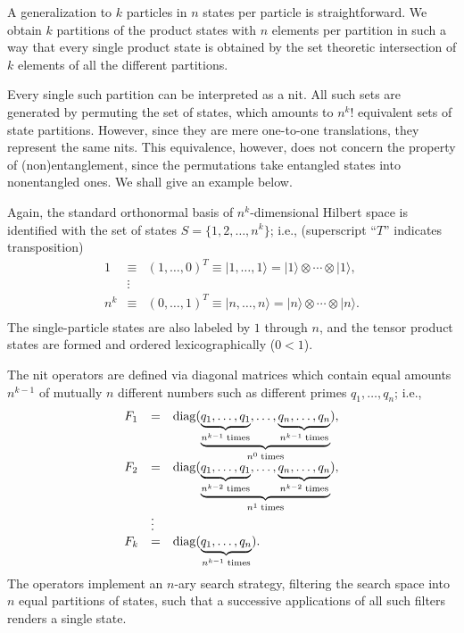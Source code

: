 A generalization to $k$ particles in $n$ states per particle is straightforward.
We obtain
$k$ partitions of the product states with
$n$ elements per partition in such a way that
every single product state is obtained by the set theoretic intersection of
$k$ elements of all the different partitions.

Every single such partition can be interpreted as a nit.
All such sets are generated by permuting the set of states,
which amounts to $n^k!$ equivalent sets of state partitions.
However, since they are mere one-to-one translations,
they represent the same nits.
This equivalence, however, does not concern the property of (non)entanglement,
since the permutations take entangled states into nonentangled ones.
We shall give an example below.

Again, the standard orthonormal basis of
$n^k$-dimensional Hilbert space is identified with the set of states $S=\{1,2,\ldots ,n^k\}$; i.e.,
(superscript ``$T$'' indicates transposition)
\begin{equation}
\begin{array}{llll}
1 &\equiv& (1,\ldots,0)^T\equiv \mid 1,\ldots ,1\rangle = \mid 1\rangle \otimes \cdots \otimes \mid 1\rangle ,\\
  &\vdots&\\
n^k &\equiv& (0,\ldots,1)^T\equiv \mid n,\ldots ,n\rangle = \mid n\rangle \otimes \cdots \otimes \mid n\rangle .\\
\end{array}
\label{2002-statepart-psma}
\end{equation}
The single-particle states are also labeled by $1$ through $n$,
and the tensor product states are formed and ordered lexicographically ($0<1$).


The nit operators are defined via diagonal matrices
which contain equal amounts $n^{k-1}$ of mutually $n$ different numbers
such as different primes $q_1,\ldots ,q_n$; i.e.,
\begin{equation}
\begin{array}{llll}
F_1&=& {\rm diag} (\underbrace{\underbrace{q_1,\ldots ,q_1}_{n^{k-1}\;{\rm times}},\ldots ,\underbrace{q_n,\ldots ,q_n}_{n^{k-1}\;{\rm times}}}_{n^0\;{\rm times}}),\\
F_2&=& {\rm diag} (\underbrace{\underbrace{q_1,\ldots ,q_1}_{n^{k-2}\;{\rm times}},\ldots ,\underbrace{q_n,\ldots ,q_n}_{n^{k-2}\;{\rm times}}}_{n^1\;{\rm times}}),\\
  &\vdots&\\
F_k&=& {\rm diag} (\underbrace{q_1,\ldots ,q_n}_{n^{k-1}\;{\rm times}}).
\end{array}
\label{2002-statepart-nitopgen}
\end{equation}
The operators implement an $n$-ary search strategy,
filtering the search space into $n$ equal partitions of states,
such that a successive applications of all such filters
renders a single state.

